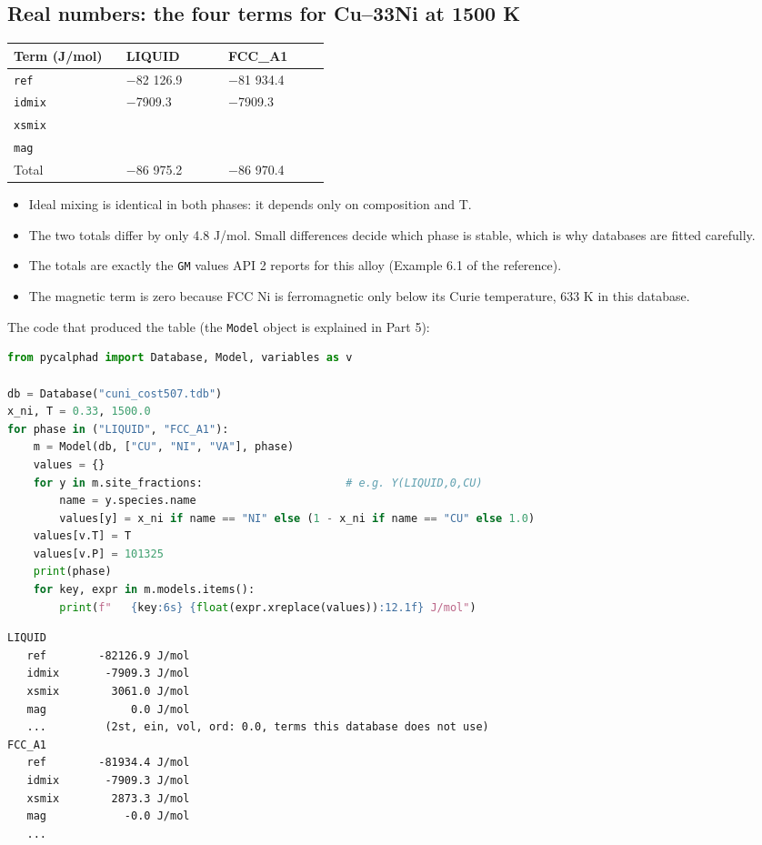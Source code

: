 \documentclass[12pt,a4paper]{article}
\begin{document}
\subsection*{Real numbers: the four terms for Cu--33Ni at 1500 K}
\begingroup\small
\begin{longtable}{>{\raggedright\arraybackslash}p{0.325\linewidth}>{\raggedright\arraybackslash}p{0.298\linewidth}>{\raggedright\arraybackslash}p{0.298\linewidth}}
\toprule
\textbf{Term (J/mol)} & \textbf{LIQUID} & \textbf{FCC\_A1} \\
\midrule
\endhead
\texttt{ref} & \(-\)82 126.9 & \(-\)81 934.4 \\
\texttt{idmix} & \(-\)7909.3 & \(-\)7909.3 \\
\texttt{xsmix} & 3061.0 & 2873.3 \\
\texttt{mag} & 0.0 & 0.0 \\
Total & \(-\)86 975.2 & \(-\)86 970.4 \\
\bottomrule
\end{longtable}
\endgroup
\begin{itemize}
\item Ideal mixing is identical in both phases: it depends only on composition and T.
\item The two totals differ by only 4.8 J/mol. Small differences decide which phase is stable, which is why databases are fitted carefully.
\item The totals are exactly the \texttt{GM} values API 2 reports for this alloy (Example 6.1 of the reference).
\item The magnetic term is zero because FCC Ni is ferromagnetic only below its Curie temperature, 633 K in this database.
\end{itemize}
The code that produced the table (the \texttt{Model} object is explained in Part 5):

\begin{lstlisting}[basicstyle={\footnotesize\ttfamily},language=Python]
from pycalphad import Database, Model, variables as v

db = Database("cuni_cost507.tdb")
x_ni, T = 0.33, 1500.0
for phase in ("LIQUID", "FCC_A1"):
    m = Model(db, ["CU", "NI", "VA"], phase)
    values = {}
    for y in m.site_fractions:                      # e.g. Y(LIQUID,0,CU)
        name = y.species.name
        values[y] = x_ni if name == "NI" else (1 - x_ni if name == "CU" else 1.0)
    values[v.T] = T
    values[v.P] = 101325
    print(phase)
    for key, expr in m.models.items():
        print(f"   {key:6s} {float(expr.xreplace(values)):12.1f} J/mol")
\end{lstlisting}
\begin{lstlisting}[basicstyle={\footnotesize\ttfamily}]
LIQUID
   ref        -82126.9 J/mol
   idmix       -7909.3 J/mol
   xsmix        3061.0 J/mol
   mag             0.0 J/mol
   ...         (2st, ein, vol, ord: 0.0, terms this database does not use)
FCC_A1
   ref        -81934.4 J/mol
   idmix       -7909.3 J/mol
   xsmix        2873.3 J/mol
   mag            -0.0 J/mol
   ...
\end{lstlisting}
\end{document}
